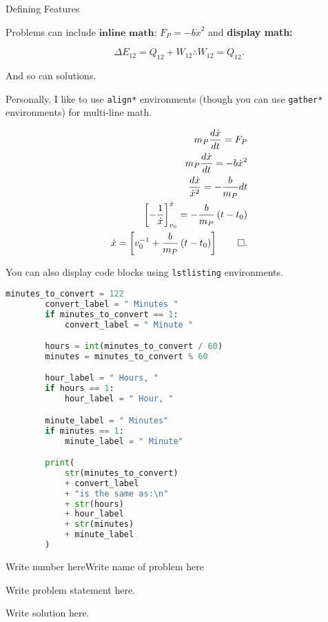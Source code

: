 \begin{hwkProblem}{2}{Defining Features}
		
	Problems can include \( \textbf{inline math: } F_{P} = - b \dot{x}^{2} \) and \textbf{display math:}

	\[
		\Delta E_{12} = Q_{12} + W_{12} \therefore W_{12} = Q_{12}
	.\]
	
	\solution

	And so can solutions.

	Personally, I like to use \lstinline{align*} environments (though you can use \lstinline{gather*} environments) for multi-line math.

	\begin{align*}
		m_{P} \frac{d\dot{x}}{dt}                             = F_{P}                                     \\
		m_{P} \frac{d\dot{x}}{dt}                             = -b\dot{x}^{2}                             \\
		\frac{d\dot{x}}{\dot{x}^2}                            = - \frac{b}{m_{P}} dt                      \\
		\left[ - \frac{1}{\dot{x}} \right]^{\dot{x}}_{v_{0}}  = - \frac{b}{m_{P}}\left( t - t_{0} \right) \\
		\dot{x}                                               = \left[ v_{0}^{-1} + \frac{b}{m_{P}} \left( t - t_{0} \right) \right] \qed
		.\end{align*}

	You can also display code blocks using \lstinline{lstlisting} environments.

	\begin{lstlisting}[language=python]
		minutes_to_convert = 122
		convert_label = " Minutes "
		if minutes_to_convert == 1:
		    convert_label = " Minute "

		hours = int(minutes_to_convert / 60)
		minutes = minutes_to_convert % 60

		hour_label = " Hours, "
		if hours == 1:
		    hour_label = " Hour, "

		minute_label = " Minutes"
		if minutes == 1:
		    minute_label = " Minute"

		print(
		    str(minutes_to_convert)
		    + convert_label
		    + "is the same as:\n"
		    + str(hours)
		    + hour_label
		    + str(minutes)
		    + minute_label
		)
	\end{lstlisting}

\end{hwkProblem}

\begin{hwkProblem}{Write number here}{Write name of problem here}

	Write problem statement here.

	\solution

	Write solution here.

\end{hwkProblem}


